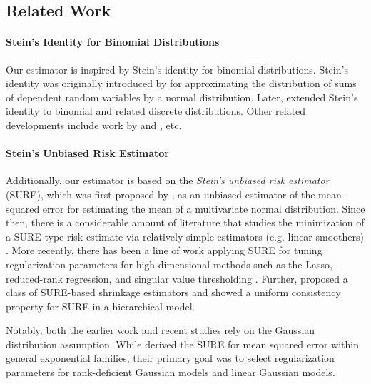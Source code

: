 \documentclass[12pt,letterpaper]{article}
\begin{document}
\subsection{Related Work}

\paragraph{Stein's Identity for Binomial Distributions} Our estimator is inspired by Stein's identity for binomial distributions. Stein's identity was originally introduced by \citet{stein1972bound} for approximating the distribution of sums of dependent random variables by a normal distribution. Later, \citet{barbour2001compound} extended Stein's identity to binomial and related discrete distributions. Other related developments include work by \citet{ehm1991binomial} and \citet{soon1996binomial}, etc. 

\paragraph{Stein's Unbiased Risk Estimator}
Additionally, our estimator is based on the \textit{Stein's unbiased risk estimator} (SURE), which was first proposed by \citet{stein1981estimation}, as an unbiased estimator of the mean-squared error for estimating the mean of a multivariate normal distribution. Since then, there is a considerable amount of literature that studies the minimization of a SURE-type risk estimate via relatively simple estimators (e.g. linear smoothers) \citep[][etc.]{li1985stein,li1986asymptotic,li1987asymptotic,johnstone1988inadmissibility,kneip1994ordered,donoho1995adapting}. More recently, there has been a line of work applying SURE for tuning regularization parameters for high-dimensional methods such as the Lasso, reduced-rank regression, and singular value thresholding \citep[e.g.,][]{tibshirani2012degrees,candes2013unbiased,mukherjee2015degrees}. Further, \citet{xie2012sure} proposed a class of SURE-based shrinkage estimators and showed a uniform consistency property for SURE in a hierarchical model. 

Notably, both the earlier work and recent studies \citep[e.g.,][]{xie2012sure,ghosh2025stein,nobel2023tractable,karamikabir2021wavelet,kim2021noise2score, chen2025compound} rely on the Gaussian distribution assumption. While \citet{eldar2008generalized} derived the SURE for mean squared error within general exponential families, their primary goal was to select regularization parameters for rank-deficient Gaussian models and linear Gaussian models.
\end{document}
